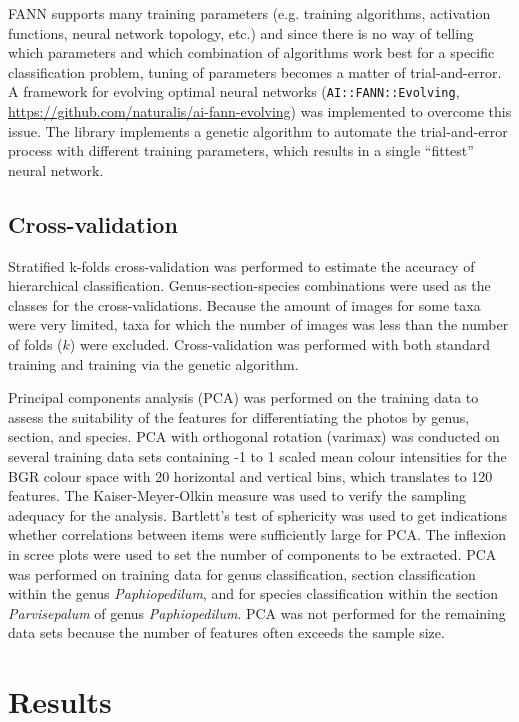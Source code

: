 \documentclass[3p,twocolumn,10pt]{elsarticle}
\begin{document}
FANN supports many training parameters (e.g. training algorithms, activation functions, neural network topology, etc.) and since there is no way of telling which parameters and which combination of algorithms work best for a specific classification problem, tuning of parameters becomes a matter of trial-and-error. A framework for evolving optimal neural networks (\verb/AI::FANN::Evolving/, \url{https://github.com/naturalis/ai-fann-evolving}) was implemented to overcome this issue. The library implements a genetic algorithm to automate the trial-and-error process with different training parameters, which results in a single ``fittest'' neural network.

\subsection{Cross-validation}

Stratified k-folds cross-validation was performed to estimate the accuracy of hierarchical classification. Genus-section-species combinations were used as the classes for the cross-validations. Because the amount of images for some taxa were very limited, taxa for which the number of images was less than the number of folds ($k$) were excluded. Cross-validation was performed with both standard training and training via the genetic algorithm.

Principal components analysis (PCA) was performed on the training data to assess the suitability of the features for differentiating the photos by genus, section, and species. PCA with orthogonal rotation (varimax) was conducted on several training data sets containing -1 to 1 scaled mean colour intensities for the BGR colour space with 20 horizontal and vertical bins, which translates to 120 features. The Kaiser-Meyer-Olkin measure was used to verify the sampling adequacy for the analysis. Bartlett's test of sphericity was used to get indications whether correlations between items were sufficiently large for PCA. The inflexion in scree plots were used to set the number of components to be extracted. PCA was performed on training data for genus classification, section classification within the genus \textit{Paphiopedilum}, and for species classification within the section \textit{Parvisepalum} of genus \textit{Paphiopedilum}. PCA was not performed for the remaining data sets because the number of features often exceeds the sample size.

\section{Results}
\label{sec:results}
\end{document}
